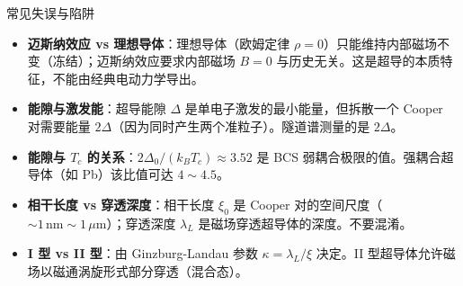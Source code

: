 \begin{errorbox}{常见失误与陷阱}
\begin{itemize}
    \item \textbf{迈斯纳效应 vs 理想导体}：理想导体（欧姆定律 $\rho=0$）只能维持内部磁场不变（冻结）；迈斯纳效应要求内部磁场 $B=0$ 与历史无关。这是超导的本质特征，不能由经典电动力学导出。
    \item \textbf{能隙与激发能}：超导能隙 $\Delta$ 是单电子激发的最小能量，但拆散一个 Cooper 对需要能量 $2\Delta$（因为同时产生两个准粒子）。隧道谱测量的是 $2\Delta$。
    \item \textbf{能隙与 $T_c$ 的关系}：$2\Delta_0/(k_BT_c)\approx3.52$ 是 BCS 弱耦合极限的值。强耦合超导体（如 Pb）该比值可达 $4\sim4.5$。
    \item \textbf{相干长度 vs 穿透深度}：相干长度 $\xi_0$ 是 Cooper 对的空间尺度（$\sim1\,\text{nm}\sim1\,\mu\text{m}$）；穿透深度 $\lambda_L$ 是磁场穿透超导体的深度。不要混淆。
    \item \textbf{I 型 vs II 型}：由 Ginzburg-Landau 参数 $\kappa=\lambda_L/\xi$ 决定。II 型超导体允许磁场以磁通涡旋形式部分穿透（混合态）。
\end{itemize}
\end{errorbox}

